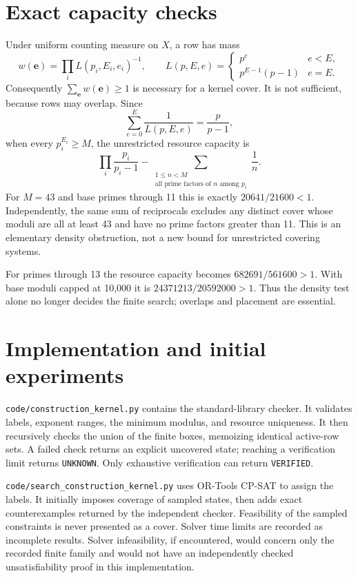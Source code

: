 \documentclass[11pt]{article}
\begin{document}
\section{Exact capacity checks}
Under uniform counting measure on $X$, a row has mass
\[
 w(\mathbf e)=\prod_i L(p_i,E_i,e_i)^{-1},\qquad
 L(p,E,e)=\begin{cases}p^e&e<E,\\p^{E-1}(p-1)&e=E.\end{cases}
\]
Consequently $\sum_{\mathbf e}w(\mathbf e)\geq1$ is necessary for a
kernel cover. It is not sufficient, because rows may overlap.
Since
\[
 \sum_{e=0}^E\frac1{L(p,E,e)}=\frac p{p-1},
\]
when every $p_i^{E_i}\geq M$, the unrestricted resource capacity is
\[
 \prod_i\frac{p_i}{p_i-1}
 -\sum_{\substack{1\leq n<M\\\text{all prime factors of }n\text{ among }p_i}}
 \frac1n.
\]
For $M=43$ and base primes through 11 this is exactly
$20641/21600<1$. Independently, the same sum of reciprocals excludes any
distinct cover whose moduli are all at least 43 and have no prime factors
greater than 11. This is an elementary density obstruction, not a new bound
for unrestricted covering systems.

For primes through 13 the resource capacity becomes
$682691/561600>1$. With base moduli capped at 10,000 it is
$24371213/20592000>1$. Thus the density test alone no longer decides the
finite search; overlaps and placement are essential.

\section{Implementation and initial experiments}
\texttt{code/construction\_kernel.py} contains the standard-library checker.
It validates labels, exponent ranges, the minimum modulus, and resource
uniqueness. It then recursively checks the union of the finite boxes,
memoizing identical active-row sets. A failed check returns an explicit
uncovered state; reaching a verification limit returns \texttt{UNKNOWN}.
Only exhaustive verification can return \texttt{VERIFIED}.

\texttt{code/search\_construction\_kernel.py} uses OR-Tools CP-SAT to
assign the labels. It initially imposes coverage of sampled states, then
adds exact counterexamples returned by the independent checker. Feasibility
of the sampled constraints is never presented as a cover. Solver time limits
are recorded as incomplete results. Solver infeasibility, if encountered,
would concern only the recorded finite family and would not have an
independently checked unsatisfiability proof in this implementation.
\end{document}
